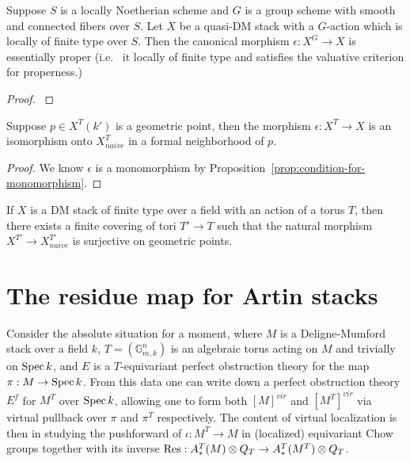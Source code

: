 \documentclass[12pt,dvipsnames]{amsart}
\begin{document}
\begin{proposition}\label{rl-000N}
  Suppose $S$ is a locally Noetherian scheme and \(G\) is a group scheme with smooth and connected fibers over \(S\). Let \(X\) be a quasi-DM stack with a \(G\)-action which is locally of finite type over \(S\). Then the canonical morphism \(\epsilon:X^{G}\to X\) is essentially proper (i.e. \ it locally of finite type and satisfies the valuative criterion for properness.)
\end{proposition}
\begin{proof}
  \cite[Proposition A.22]{aranha-khan-latyntsev-etal_VirtualLocalizationRevisited2025}
\end{proof}

\begin{lemma}\label{rl-000O}
  Suppose $p\in X^{T}(k')$ is a geometric point, then the morphism $\epsilon:X^{T}\to X$ is an isomorphism onto $X^T_{naive}$ in a formal neighborhood of $p$.
\end{lemma}
\begin{proof}
  We know $\epsilon$ is a monomorphism by Proposition~\ref{prop:condition-for-monomorphism}. 
\end{proof}
\begin{lemma}\label{rl-000P}\label{lem:finite-cover}
  If $X$ is a DM stack of finite type over a field with an action of a torus $T$, then there exists a finite covering of tori $T'\to T$ such that the natural morphism $X^{T'} \to X^{T'}_{naive}$ is surjective on geometric points.
\end{lemma}

\section{The residue map for Artin stacks}\label{rl-000Q}

Consider the absolute situation for a moment, where \(M\) is a Deligne-Mumford stack over a field \(k\), \(T = (\mathbb G_{m,k}^n)\) is an algebraic torus acting on \(M\) and trivially on \(\operatorname{Spec} k\), and \(E\) is a \(T\)-equivariant perfect obstruction theory for the map \(\pi:M\to \operatorname{Spec} k\). From this data one can write down a perfect obstruction theory \(E^f\) for \(M^T\) over \(\operatorname{Spec} k\), allowing one to form both \([M]^{vir}\) and \([M^T]^{vir}\) via virtual pullback over \(\pi\) and \(\pi^T\) respectively. The content of virtual localization is then in studying the pushforward of \(\iota:M^T\to M\) in (localized) equivariant Chow groups together with its inverse \(\operatorname{Res}:A^T_*(M)\otimes Q_T\to A^T_*(M^T)\otimes Q_T\).
\end{document}
